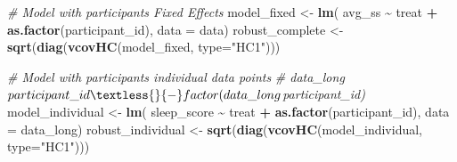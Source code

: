 \documentclass[
]{article}
\newenvironment{Shaded}{\begin{snugshade}}{\end{snugshade}}
\newcommand{\AttributeTok}[1]{\textcolor[rgb]{0.13,0.29,0.53}{#1}}
\newcommand{\CommentTok}[1]{\textcolor[rgb]{0.56,0.35,0.01}{\textit{#1}}}
\newcommand{\FunctionTok}[1]{\textcolor[rgb]{0.13,0.29,0.53}{\textbf{#1}}}
\newcommand{\NormalTok}[1]{#1}
\newcommand{\OtherTok}[1]{\textcolor[rgb]{0.56,0.35,0.01}{#1}}
\newcommand{\SpecialCharTok}[1]{\textcolor[rgb]{0.81,0.36,0.00}{\textbf{#1}}}
\newcommand{\StringTok}[1]{\textcolor[rgb]{0.31,0.60,0.02}{#1}}
\begin{document}
\begin{Shaded}
\begin{Highlighting}[]
\CommentTok{\# Model with participants\textquotesingle{} Fixed Effects}
\NormalTok{model\_fixed }\OtherTok{\textless{}{-}} \FunctionTok{lm}\NormalTok{(}
\NormalTok{  avg\_ss }\SpecialCharTok{\textasciitilde{}}\NormalTok{ treat }\SpecialCharTok{+} \FunctionTok{as.factor}\NormalTok{(participant\_id),}
  \AttributeTok{data =}\NormalTok{ data)}
\NormalTok{robust\_complete }\OtherTok{\textless{}{-}} \FunctionTok{sqrt}\NormalTok{(}\FunctionTok{diag}\NormalTok{(}\FunctionTok{vcovHC}\NormalTok{(model\_fixed, }\AttributeTok{type=}\StringTok{"HC1"}\NormalTok{)))}

\CommentTok{\# Model with participants\textquotesingle{} individual data points}
\CommentTok{\# data\_long$participant\_id \textless{}{-} factor(data\_long$participant\_id)}
\NormalTok{model\_individual }\OtherTok{\textless{}{-}} \FunctionTok{lm}\NormalTok{(}
\NormalTok{  sleep\_score }\SpecialCharTok{\textasciitilde{}}\NormalTok{ treat }\SpecialCharTok{+} \FunctionTok{as.factor}\NormalTok{(participant\_id), }
  \AttributeTok{data =}\NormalTok{ data\_long)}
\NormalTok{robust\_individual }\OtherTok{\textless{}{-}} \FunctionTok{sqrt}\NormalTok{(}\FunctionTok{diag}\NormalTok{(}\FunctionTok{vcovHC}\NormalTok{(model\_individual, }\AttributeTok{type=}\StringTok{"HC1"}\NormalTok{)))}
\end{Highlighting}
\end{Shaded}
\end{document}
